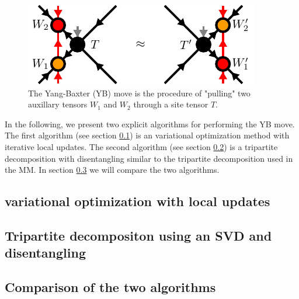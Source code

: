 \begin{figure}
	\centering
	\includegraphics[scale=1]{figures/tikz/disoTPS/yang_baxter_move/yang_baxter_move.pdf}
	\caption{The Yang-Baxter (YB) move is the procedure of "pulling" two auxillary tensors $W_1$ and $W_2$ through a site tensor $T$.}
	\label{fig:disoTPS_YB_move_closeup}
\end{figure}
In the following, we present two explicit algorithms for performing the YB move. The first algorithm (see section \ref{sec:YB_move_iterative_local_optimization}) is an variational optimization method with iterative local updates. The second algorithm (see section \ref{sec:YB_move_svd_disentangle}) is a tripartite decomposition with disentangling similar to the tripartite decomposition used in the MM. In section \ref{sec:YB_move_comparison} we will compare the two algorithms.

\subsection{variational optimization with local updates}
\label{sec:YB_move_iterative_local_optimization}


\subsection{Tripartite decompositon using an SVD and disentangling}
\label{sec:YB_move_svd_disentangle}


\subsection{Comparison of the two algorithms}
\label{sec:YB_move_comparison}
